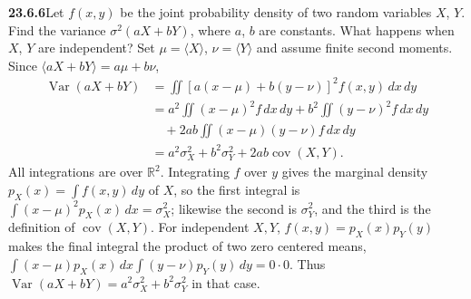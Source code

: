 \par\bigskip
\noindent\textbf{23.6.6}\quad Let $f(x,y)$ be the joint
probability density of two random variables $X$, $Y$. Find the
variance $\sigma^{2}(aX+bY)$, where $a$, $b$ are constants. What
happens when $X$, $Y$ are independent?
\solution
Set $\mu=\langle X\rangle$, $\nu=\langle Y\rangle$ and assume finite
second moments. Since $\langle aX+bY\rangle=a\mu+b\nu$,
\begin{align*}
\operatorname{Var}(aX+bY)
&=\iint[a(x-\mu)+b(y-\nu)]^2f(x,y)\,dx\,dy\\
&=a^2\iint(x-\mu)^2f\,dx\,dy
+b^2\iint(y-\nu)^2f\,dx\,dy\\
&\quad+2ab\iint(x-\mu)(y-\nu)f\,dx\,dy\\
&=\boxed{a^2\sigma_X^2+b^2\sigma_Y^2+2ab\operatorname{cov}(X,Y)}.
\end{align*}
All integrations are over $\mathbb R^2$. Integrating $f$ over $y$ gives
the marginal density $p_X(x)=\int f(x,y)\,dy$ of $X$, so the first
integral is $\int(x-\mu)^2p_X(x)\,dx=\sigma_X^2$; likewise the second is
$\sigma_Y^2$, and the third is the definition of $\operatorname{cov}(X,Y)$.
For independent $X,Y$, $f(x,y)=p_X(x)p_Y(y)$ makes the final integral
the product of two zero centered means,
$\int(x-\mu)p_X(x)\,dx\int(y-\nu)p_Y(y)\,dy=0\cdot0$.
Thus $\boxed{\operatorname{Var}(aX+bY)
=a^2\sigma_X^2+b^2\sigma_Y^2}$ in that case.


